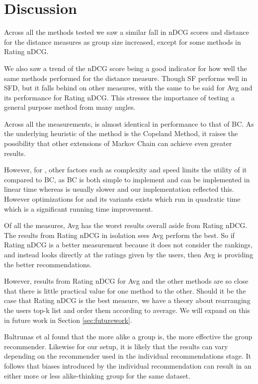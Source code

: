 \section{Discussion} \label{sec:discussion}

Across all the methods tested we saw a similar fall in nDCG scores and distance for the distance measures as group size increased, except for some methods in Rating nDCG.

We also saw a trend of the nDCG score being a good indicator for how well the same  methods performed for the distance measure. Though SF performs well in SFD, but it falls behind on other measures, with the same to be said for Avg and its performance for Rating nDCG. This stresses the importance of testing a general purpose method from many angles.

Across all the measurements, \MC is almost identical in performance to that of BC. As the underlying heuristic of the \MC method is the Copeland Method, it raises the possibility that other extensions of Markov Chain can achieve even greater results.

However, for \MC, other factors such as complexity and speed limits the utility of it compared to BC, as BC is both simple to implement and can be implemented in linear time whereas \MC is usually slower and our implementation reflected this. However optimizations for \MC and its variants exists which run in quadratic time which is a significant running time improvement\cite{rank:aggregation}.

Of all the measures, Avg has the worst results overall aside from Rating nDCG. The results from Rating nDCG in isolation sees Avg perform the best. So if Rating nDCG is a better measurement because it does not consider the rankings, and instead looks directly at the ratings given by the users, then Avg is providing the better recommendations.

However, results from Rating nDCG for Avg and the other methods are so close that there is little practical value for one method to the other. Should it be the case that Rating nDCG is the best measure, we have a theory about rearranging the users top-k list and order them according to average. We will expand on this in future work in Section \ref{sec:futurework}.

Baltrunas et al found that the more alike a group is, the more effective the group recommender\cite{Baltrunas:2010:GRR:1864708.1864733}. Likewise for our setup, it is likely that the results can vary depending on the recommender used in the individual recommendations stage. It follows that biases introduced by the individual recommendation can result in an either more or less alike-thinking group for the same dataset.

